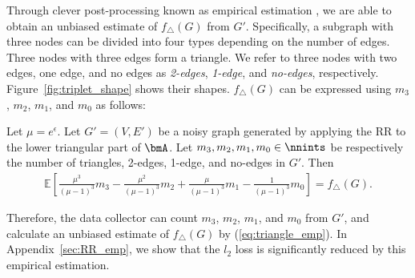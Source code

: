 Through 
clever post-processing 
known as 
empirical estimation 
\cite{Kairouz_ICML16,Murakami_USENIX19,Wang_USENIX17},
we are able to obtain an unbiased estimate of $f_\triangle(G)$ 
from $G'$. 
Specifically, a subgraph with three nodes can be divided into four types depending on the number of edges. 
Three nodes with three edges form a triangle. 
We refer to three nodes with two edges, one edge, and no edges as \textit{2-edges},  \textit{1-edge}, and  \textit{no-edges}, respectively. 
Figure~\ref{fig:triplet_shape} shows their shapes. 
$f_\triangle(G)$ can be expressed using $m_3$, $m_2$, $m_1$, and $m_0$ as follows:

\begin{proposition}\label{prop:triangle_emp}
  Let $\mu = e^\epsilon$. 
  Let $G'=(V,E')$ be a noisy graph generated by applying the RR to the lower triangular part of $\bmA$.
  Let $m_3, m_2, m_1, m_0 \in \nnints$ be respectively the number of triangles, 2-edges, 1-edge, and no-edges in $G'$. 
  Then 
  \begin{align}
      \textstyle{\mathbb{E}\left[ \frac{\mu^3}{(\mu-1)^3} m_3 - \frac{\mu^2}{(\mu-1)^3} m_2 + \frac{\mu}{(\mu-1)^3} m_1 - \frac{1}{(\mu-1)^3} m_0 \right] = f_\triangle(G).}
      \label{eq:triangle_emp}
  \end{align}
\end{proposition}

Therefore, the data collector can count $m_3$, $m_2$, $m_1$, and $m_0$ from $G'$, and calculate an unbiased estimate of $f_\triangle(G)$ by (\ref{eq:triangle_emp}). 
In Appendix~\ref{sec:RR_emp}, we show that the $l_2$ loss is significantly reduced by this empirical estimation.

